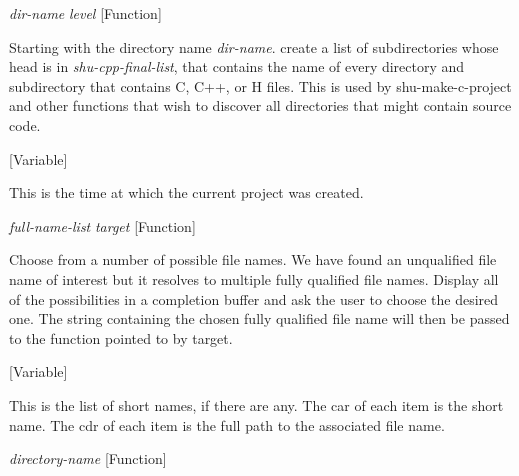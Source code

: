\vspace{1em}
\noindent
{}
\usebox{\funcname}\emph{dir-name} \emph{level}
 \hfill [Function]

\begin{doc-string}
Starting with the directory name \emph{dir-name}. create a list of subdirectories
whose head is in \emph{shu-cpp-final-list}, that contains the name of every directory and
subdirectory that contains C, C++, or H files.  This is used by shu-make-c-project
and other functions that wish to discover all directories that might contain
source code.
\end{doc-string}

\vspace{1em}
\noindent
{}
\usebox{\funcname}
 \hfill [Variable]

\begin{doc-string}
This is the time at which the current project was created.
\end{doc-string}

\vspace{1em}
\noindent
{}
\usebox{\funcname}\emph{full-name-list} \emph{target}
 \hfill [Function]

\begin{doc-string}
Choose from a number of possible file names.
We have found an unqualified file name of interest but it resolves to multiple
fully qualified file names.  Display all of the possibilities in a completion
buffer and ask the user to choose the desired one.  The string containing the
chosen fully qualified file name will then be passed to the function pointed
to by target.
\end{doc-string}

\vspace{1em}
\noindent
{}
\usebox{\funcname}
 \hfill [Variable]

\begin{doc-string}
This is the list of short names, if there are any.  The car of each item is
the short name.  The cdr of each item is the full path to the associated
file name.
\end{doc-string}

\vspace{1em}
\noindent
{}
\usebox{\funcname}\emph{directory-name}
 \hfill [Function]

